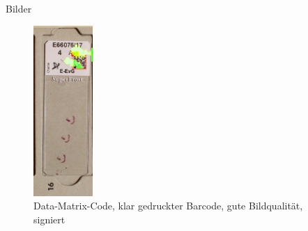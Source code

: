 \documentclass{beamer}
\begin{document}
\begin{frame}{Bilder}
\begin{figure}
      \hfill
      \includegraphics[width=0.2\textwidth]{./assets/Cell100325_1_6_top1_prosconsminweight.PNG}
      \caption{Data-Matrix-Code, klar gedruckter Barcode, gute Bildqualität, signiert}
    \end{figure}
  \end{frame}
\end{document}
